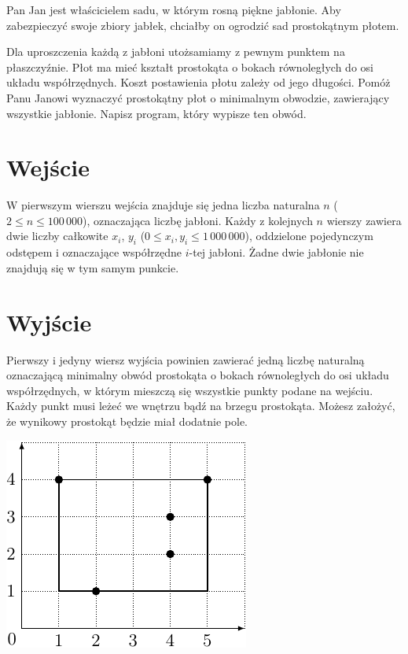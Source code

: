 \documentclass{spiral-kurs}
\begin{document}
\makeheader
%
  Pan Jan jest właścicielem sadu, w którym rosną piękne jabłonie.
  Aby zabezpieczyć swoje zbiory jabłek, chciałby on ogrodzić sad prostokątnym płotem.

  Dla uproszczenia każdą z jabłoni utożsamiamy z pewnym punktem na płaszczyźnie.
  Płot ma mieć kształt prostokąta o bokach równoległych do osi układu współrzędnych.
  Koszt postawienia płotu zależy od jego długości.
  Pomóż Panu Janowi wyznaczyć prostokątny płot o minimalnym obwodzie, zawierający wszystkie jabłonie.
  Napisz program, który wypisze ten obwód.

  \section{Wejście}
W pierwszym wierszu wejścia znajduje się jedna liczba naturalna $n$ ($2\le n\le 100\,000$),
oznaczająca liczbę jabłoni.
Każdy z kolejnych $n$ wierszy zawiera dwie liczby całkowite $x_i$, $y_i$
($0\le x_i,y_i\le 1\,000\,000$), oddzielone pojedynczym odstępem i oznaczające
współrzędne $i$-tej jabłoni.
Żadne dwie jabłonie nie znajdują się w tym samym punkcie.

\section{Wyjście}
Pierwszy i jedyny wiersz wyjścia powinien zawierać jedną liczbę naturalną oznaczającą
minimalny obwód prostokąta o bokach równoległych do osi układu współrzędnych,
w którym mieszczą się wszystkie punkty podane na wejściu.
Każdy punkt musi leżeć we wnętrzu bądź na brzegu prostokąta.
Możesz założyć, że wynikowy prostokąt będzie miał dodatnie pole.


    \includegraphics{sadrys-crop}


  
\end{document}
